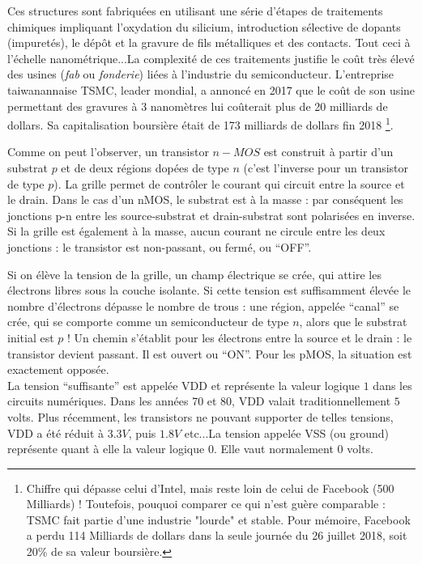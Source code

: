 Ces structures sont fabriquées en utilisant une série d'étapes de traitements chimiques impliquant l'oxydation
du silicium, introduction sélective de dopants (impuretés), le dépôt et la gravure de fils métalliques
et des contacts. Tout ceci à l'échelle nanométrique...La complexité de ces traitements justifie le coût très élevé des usines ({\it fab} ou {\it fonderie}) liées à
l'industrie du semiconducteur. L'entreprise taiwanannaise TSMC, leader mondial, a annoncé en 2017 que le coût de son usine permettant des gravures
à 3 nanomètres lui coûterait plus de 20 milliards de dollars. Sa capitalisation boursière était de 173 milliards de dollars fin 2018
\footnote{Chiffre qui dépasse celui d'Intel, mais reste loin de celui de Facebook (500 Milliards) ! Toutefois, pouquoi comparer ce qui n'est guère
comparable : TSMC fait partie d'une industrie "lourde" et stable. Pour mémoire,
Facebook a perdu 114 Milliards de dollars dans la seule journée du 26 juillet 2018, soit 20\% de sa valeur boursière.}.

Comme on peut l'observer, un transistor $n-MOS$ est construit à partir d'un substrat $p$ et de deux régions dopées de type $n$ (c'est l'inverse pour un transistor de type $p$). La grille permet de  contrôler le courant qui circuit entre la source et le drain. Dans le cas d'un nMOS, le substrat est à la masse : par conséquent les jonctions p-n entre les source-substrat et drain-substrat sont polarisées en inverse. Si la grille est également à la masse, aucun courant ne circule entre les deux jonctions : le transistor est non-passant, ou fermé, ou ``OFF''.

Si on élève la tension de la grille, un champ électrique se crée, qui attire les électrons libres sous la couche isolante. Si cette tension est suffisamment élevée le nombre d'électrons dépasse le nombre de trous : une région, appelée ``canal'' se crée, qui se comporte comme un semiconducteur de type $n$, alors que le substrat initial est $p$ ! Un chemin s'établit pour les électrons entre la source et le drain : le transistor devient passant. Il est ouvert ou ``ON''. Pour les pMOS, la situation est exactement opposée.\\

La tension ``suffisante'' est appelée VDD et représente la valeur logique $1$ dans les circuits numériques. Dans les années 70 et 80, VDD valait traditionnellement $5$ volts.
Plus récemment, les transistors ne pouvant supporter de telles tensions, VDD a été réduit à $3.3V$, puis $1.8V$ etc...La tension appelée VSS (ou ground) représente quant à elle la valeur logique $0$. Elle vaut normalement $0$ volts.\\

